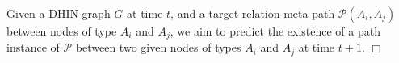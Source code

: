 \begin{definition}\label{problemdef}Given a DHIN graph $G$ at time $t$, and a target relation meta path $\mathcal{P}(A_i,A_j)$ between nodes of type $A_i$ and $A_j$, we aim to predict the existence of a path instance of $\mathcal{P}$ between two given nodes of types $A_i$ and $A_j$ at time $t+1$. $\Box$ \end{definition}



%
%
%





